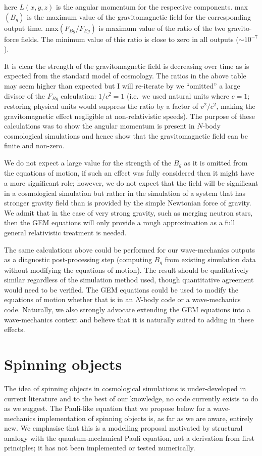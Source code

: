 \noindent here $L(x,y,z)$ is the angular momentum for the respective components. max$(B_g)$ is the maximum value of the gravitomagnetic field for the corresponding output time. max$(F_{Bg}/F_{Eg})$ is maximum value of the ratio of the two gravito-force fields. The minimum value of this ratio is close to zero in all outputs ($\sim 10^{-7}$). 

It is clear the strength of the gravitomagnetic field is decreasing over time as is expected from the standard model of cosmology. The ratios in the above table may seem higher than expected but I will re-iterate by we ``omitted'' a large divisor of the $F_{Bg}$ calculation: $1/c^2 = 1$ (i.e.\ we used natural units where $c = 1$; restoring physical units would suppress the ratio by a factor of $v^2/c^2$, making the gravitomagnetic effect negligible at non-relativistic speeds). The purpose of these calculations was to show the angular momentum is present in $N$-body cosmological simulations and hence show that the gravitomagnetic field can be finite and non-zero.

We do not expect a large value for the strength of the $B_g$ as it is omitted from the equations of motion, if such an effect was fully considered then it might have a more significant role; however, we do not expect that the field will be significant in a cosmological simulation but rather in the simulation of a system that has stronger gravity field than is provided by the simple Newtonian force of gravity. We admit that in the case of very strong gravity, such as merging neutron stars, then the GEM equations will only provide a rough approximation as a full general relativistic treatment is needed.

The same calculations above could be performed for our wave-mechanics outputs as a diagnostic post-processing step (computing $B_g$ from existing simulation data without modifying the equations of motion). The result should be qualitatively similar regardless of the simulation method used, though quantitative agreement would need to be verified. The GEM equations could be used to modify the equations of motion whether that is in an $N$-body code or a wave-mechanics code. Naturally, we also strongly advocate extending the GEM equations into a wave-mechanics context and believe that it is naturally suited to adding in these effects.

\section{Spinning objects}
\label{spinobj}
The idea of spinning objects in cosmological simulations is under-developed in current literature and to the best of our knowledge, no code currently exists to do as we suggest. The Pauli-like equation that we propose below for a wave-mechanics implementation of spinning objects is, as far as we are aware, entirely new. We emphasise that this is a modelling proposal motivated by structural analogy with the quantum-mechanical Pauli equation, not a derivation from first principles; it has not been implemented or tested numerically.

